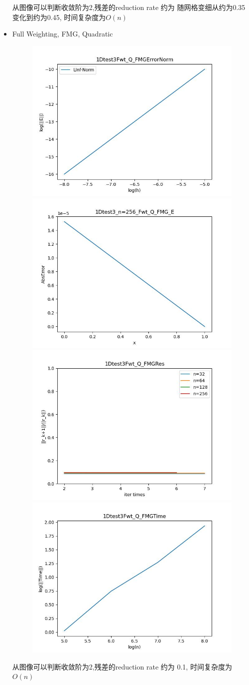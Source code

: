 \documentclass{article}
\begin{document}
\begin{itemize}
    从图像可以判断收敛阶为2,残差的reduction rate 约为 随网格变细从约为0.35变化到约为0.45, 时间复杂度为$O(n)$
    \newpage
    \item Full Weighting, FMG, Quadratic
    \begin{figure}[h]
        \centering
        \includegraphics[width=0.35\linewidth]{1Dtest3Fwt_Q_FMGErrorNorm.jpg}
        \includegraphics[width=0.35\linewidth]{1Dtest3_n=256_Fwt_Q_FMG_E.jpg}
        \includegraphics[width=0.35\linewidth]{1Dtest3Fwt_Q_FMGRes.jpg}
        \includegraphics[width=0.35\linewidth]{1Dtest3Fwt_Q_FMGTime.jpg}
    \end{figure}
    
    从图像可以判断收敛阶为2,残差的reduction rate 约为 0.1, 时间复杂度为$O(n)$


\end{itemize}
\end{document}
